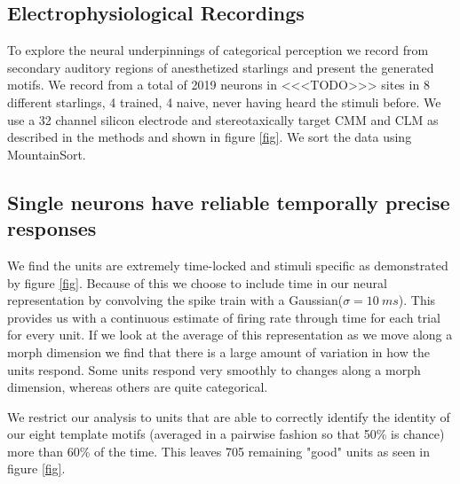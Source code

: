 \subsection{Electrophysiological Recordings}

To explore the neural underpinnings of categorical perception we record from secondary auditory regions of anesthetized starlings and present the generated motifs. We record from a total of 2019 neurons in <<<TODO>>> sites in 8 different starlings, 4 trained, 4 naive, never having heard the stimuli before. We use a 32 channel silicon electrode and stereotaxically target \ac{CMM} and \ac{CLM} as described in the methods and shown in figure \ref{fig}. We sort the data using MountainSort\cite{mountainsort}. 

\subsection{Single neurons have reliable temporally precise responses}



We find the units are extremely time-locked and stimuli specific as demonstrated by figure \ref{fig}. Because of this we choose to include time in our neural representation by convolving the spike train with a Gaussian($\sigma = \SI{10}{ms}$). This provides us with a continuous estimate of firing rate through time for each trial for every unit. If we look at the average of this representation as we move along a morph dimension we find that there is a large amount of variation in how the units respond. Some units respond very smoothly to changes along a morph dimension, whereas others are quite categorical.

We restrict our analysis to units that are able to correctly identify the identity of our eight template motifs (averaged in a pairwise fashion so that 50\% is chance) more than 60\% of the time. This leaves 705 remaining "good" units as seen in figure \ref{fig}.

